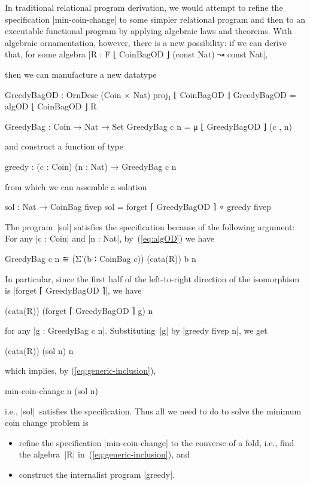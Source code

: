 In traditional relational program derivation, we would attempt to refine the specification |min-coin-change| to some simpler relational program and then to an executable functional program by applying algebraic laws and theorems.
With algebraic ornamentation, however, there is a new possibility: if we can derive that, for some algebra |R : Ḟ ⌊ CoinBagOD ⌋ (const Nat) ↝ const Nat|,
then we can manufacture a new datatype
\begin{code}
GreedyBagOD : OrnDesc (Coin × Nat) proj₁ ⌊ CoinBagOD ⌋
GreedyBagOD = algOD ⌊ CoinBagOD ⌋ R

GreedyBag : Coin → Nat → Set
GreedyBag c n = μ ⌊ GreedyBagOD ⌋ (c , n)
\end{code}
and construct a function of type
\begin{code}
greedy : (c : Coin) (n : Nat) → GreedyBag c n
\end{code}
from which we can assemble a solution
\begin{code}
sol : Nat → CoinBag fivep
sol = forget ⌈ GreedyBagOD ⌉ ∘ greedy fivep
\end{code}
The program~|sol| satisfies the specification because of the following argument:
For any |c : Coin| and |n : Nat|, by~(\ref{eq:algOD}) we have
\begin{code}
GreedyBag c n ≅ (Σ'(b ∶ CoinBag c)) (cata(R)) b n
\end{code}
In particular, since the first half of the left-to-right direction of the isomorphism is |forget ⌈ GreedyBagOD ⌉|, we have
\begin{code}
(cata(R)) (forget ⌈ GreedyBagOD ⌉ g) n
\end{code}
for any |g : GreedyBag c n|.
Substituting~|g| by |greedy fivep n|, we get
\begin{code}
(cata(R)) (sol n) n
\end{code}
which implies, by (\ref{eq:generic-inclusion}),
\begin{code}
min-coin-change n (sol n)
\end{code}
i.e., |sol|~satisfies the specification.
Thus all we need to do to solve the minimum coin change problem is
\begin{itemize}
\item refine the specification |min-coin-change| to the converse of a fold, i.e., find the algebra~|R| in~(\ref{eq:generic-inclusion}), and
\item construct the internalist program |greedy|.
\end{itemize}

